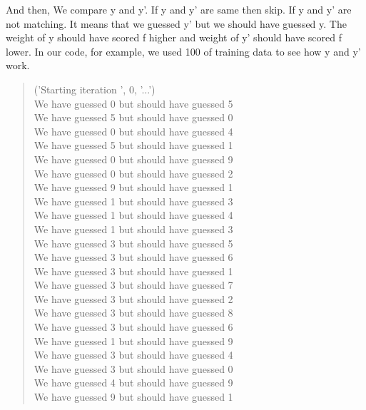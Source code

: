 \documentclass{article}
\begin{document}
        And then, We compare y and y'. If y and y' are same then skip. If y and y' are not matching. It means that we guessed y' but we should have guessed y. The weight of y should have scored f higher and weight of y' should have scored f lower. \newline
        In our code, for example, we used 100 of training data to see how y and y' work. \newline
        \begin{quote}
        ('Starting iteration ', 0, '...')\\
        We have guessed 0 but should have guessed 5\\
        We have guessed 5 but should have guessed 0\\
        We have guessed 0 but should have guessed 4\\
        We have guessed 5 but should have guessed 1\\
        We have guessed 0 but should have guessed 9\\
        We have guessed 0 but should have guessed 2\\
        We have guessed 9 but should have guessed 1\\
        We have guessed 1 but should have guessed 3\\
        We have guessed 1 but should have guessed 4\\
        We have guessed 1 but should have guessed 3\\
        We have guessed 3 but should have guessed 5\\
        We have guessed 3 but should have guessed 6\\
        We have guessed 3 but should have guessed 1\\
        We have guessed 3 but should have guessed 7\\
        We have guessed 3 but should have guessed 2\\
        We have guessed 3 but should have guessed 8\\
        We have guessed 3 but should have guessed 6\\
        We have guessed 1 but should have guessed 9\\
        We have guessed 3 but should have guessed 4\\
        We have guessed 3 but should have guessed 0\\
        We have guessed 4 but should have guessed 9\\
        We have guessed 9 but should have guessed 1\\

\end{quote}
\end{document}
